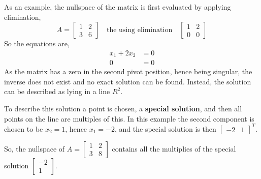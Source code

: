             \par \hfill \break
            As an example, the nullspace of the matrix is first evaluated by applying elimination,
            \begin{equation}
                A = 
                \begin{bmatrix}
                    1 & 2 \\
                    3 & 6
                \end{bmatrix}
                \quad \textrm{the using elimination} \quad
                \begin{bmatrix}
                    1 & 2 \\
                    0 & 0
                \end{bmatrix}
            \end{equation}
            So the equations are,
            \begin{equation}
                \begin{aligned}
                    x_1 + 2x_2 &= 0 \\
                    0 &= 0
                \end{aligned}
            \end{equation}
            As the matrix has a zero in the second pivot position, hence being singular, the inverse does not exist and
            no exact solution can be found. Instead, the solution can be described as lying in a line \(R^2\).

            \par \hfill \break
            To describe this solution a point is chosen, a \textbf{special solution}, and then all points on the line 
            are multiples of this. In this example the second component is chosen to be \(x_2=1\), hence \(x_1=-2\), 
            and the special solution is then \(\begin{bmatrix} -2 & 1 \end{bmatrix}^T\).

            \par \hfill \break
            So, the nullspace of \(A = \begin{bmatrix} 1 & 2 \\ 3 & 8\end{bmatrix}\) contains all the multiplies of
            the special solution \(\begin{bmatrix} -2 \\ 1 \end{bmatrix}\).


